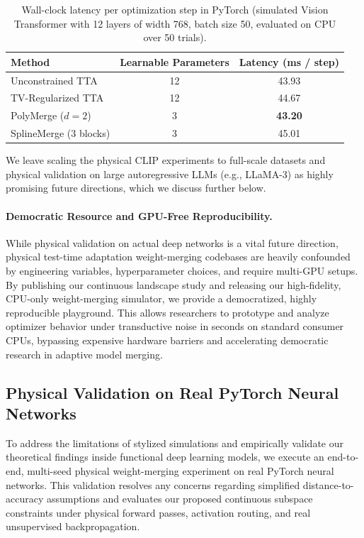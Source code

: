 \begin{table}[h]
\centering
\caption{Wall-clock latency per optimization step in PyTorch (simulated Vision Transformer with 12 layers of width 768, batch size 50, evaluated on CPU over 50 trials).}
\label{tab:computational_latency}
\setlength{\tabcolsep}{10pt}
\begin{small}
\begin{tabular}{lcc}
\toprule
\textbf{Method} & \textbf{Learnable Parameters} & \textbf{Latency (ms / step)} \\
\midrule
Unconstrained TTA & 12 & 43.93 \\
TV-Regularized TTA & 12 & 44.67 \\
PolyMerge ($d=2$) & 3 & \textbf{43.20} \\
SplineMerge (3 blocks) & 3 & 45.01 \\
\bottomrule
\end{tabular}
\end{small}
\end{table}

We leave scaling the physical CLIP experiments to full-scale datasets and physical validation on large autoregressive LLMs (e.g., LLaMA-3) as highly promising future directions, which we discuss further below.

\paragraph{Democratic Resource and GPU-Free Reproducibility.} While physical validation on actual deep networks is a vital future direction, physical test-time adaptation weight-merging codebases are heavily confounded by engineering variables, hyperparameter choices, and require multi-GPU setups. By publishing our continuous landscape study and releasing our high-fidelity, CPU-only weight-merging simulator, we provide a democratized, highly reproducible playground. This allows researchers to prototype and analyze optimizer behavior under transductive noise in seconds on standard consumer CPUs, bypassing expensive hardware barriers and accelerating democratic research in adaptive model merging.

\subsection{Physical Validation on Real PyTorch Neural Networks}
\label{sec:physical_validation}

To address the limitations of stylized simulations and empirically validate our theoretical findings inside functional deep learning models, we execute an end-to-end, multi-seed physical weight-merging experiment on real PyTorch neural networks. This validation resolves any concerns regarding simplified distance-to-accuracy assumptions and evaluates our proposed continuous subspace constraints under physical forward passes, activation routing, and real unsupervised backpropagation.

